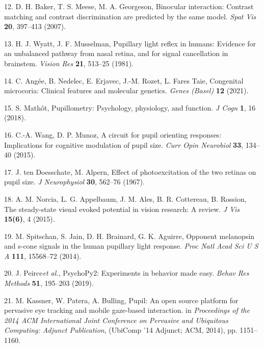 \documentclass[
]{article}
\begin{document}
\leavevmode\hypertarget{ref-Baker2007}{}%
12. D. H. Baker, T. S. Meese, M. A. Georgeson, Binocular interaction: Contrast matching and contrast discrimination are predicted by the same model. \emph{Spat Vis} \textbf{20}, 397--413 (2007).

\leavevmode\hypertarget{ref-Wyatt1981}{}%
13. H. J. Wyatt, J. F. Musselman, Pupillary light reflex in humans: Evidence for an unbalanced pathway from nasal retina, and for signal cancellation in brainstem. \emph{Vision Res} \textbf{21}, 513--25 (1981).

\leavevmode\hypertarget{ref-Angee2021}{}%
14. C. Angée, B. Nedelec, E. Erjavec, J.-M. Rozet, L. Fares Taie, Congenital microcoria: Clinical features and molecular genetics. \emph{Genes (Basel)} \textbf{12} (2021).

\leavevmode\hypertarget{ref-Mathot2018}{}%
15. S. Mathôt, Pupillometry: Psychology, physiology, and function. \emph{J Cogn} \textbf{1}, 16 (2018).

\leavevmode\hypertarget{ref-Wang2015}{}%
16. C.-A. Wang, D. P. Munoz, A circuit for pupil orienting responses: Implications for cognitive modulation of pupil size. \emph{Curr Opin Neurobiol} \textbf{33}, 134--40 (2015).

\leavevmode\hypertarget{ref-Doesschate1967}{}%
17. J. ten Doesschate, M. Alpern, Effect of photoexcitation of the two retinas on pupil size. \emph{J Neurophysiol} \textbf{30}, 562--76 (1967).

\leavevmode\hypertarget{ref-Norcia2015}{}%
18. A. M. Norcia, L. G. Appelbaum, J. M. Ales, B. R. Cottereau, B. Rossion, The steady-state visual evoked potential in vision research: A review. \emph{J Vis} \textbf{15(6)}, 4 (2015).

\leavevmode\hypertarget{ref-Spitschan2014}{}%
19. M. Spitschan, S. Jain, D. H. Brainard, G. K. Aguirre, Opponent melanopsin and s-cone signals in the human pupillary light response. \emph{Proc Natl Acad Sci U S A} \textbf{111}, 15568--72 (2014).

\leavevmode\hypertarget{ref-Peirce2019}{}%
20. J. Peirce\emph{et al.}, PsychoPy2: Experiments in behavior made easy. \emph{Behav Res Methods} \textbf{51}, 195--203 (2019).

\leavevmode\hypertarget{ref-Kassner2014}{}%
21. M. Kassner, W. Patera, A. Bulling, Pupil: An open source platform for pervasive eye tracking and mobile gaze-based interaction. in \emph{Proceedings of the 2014 ACM International Joint Conference on Pervasive and Ubiquitous Computing: Adjunct Publication}, (UbiComp '14 Adjunct; ACM, 2014), pp. 1151--1160.
\end{document}

